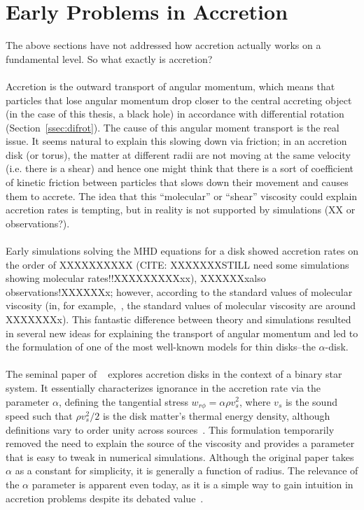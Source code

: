 
\section{Early Problems in Accretion}\label{sec:early}
The above sections have not addressed how accretion actually works on a fundamental level. So what exactly is accretion? \\
\\
Accretion is the outward transport of angular momentum, which means that particles that lose angular momentum drop closer to the central accreting object (in the case of this thesis, a black hole) in accordance with differential rotation (Section~\ref{ssec:difrot}). The cause of this angular moment transport is the real issue. It seems natural to explain this slowing down via friction; in an accretion disk (or torus), the matter at different radii are not moving at the same velocity (i.e. there is a shear) and hence one might think that there is a sort of coefficient of kinetic friction between particles that slows down their movement and causes them to accrete. The idea that this ``molecular'' or ``shear'' viscosity could explain accretion rates is tempting, but in reality is not supported by simulations (XX or observations?).\\
\\
Early simulations solving the MHD equations for a disk showed accretion rates on the order of XXXXXXXXXX (CITE: XXXXXXXSTILL need some simulations showing molecular rates!!XXXXXXXXXxx), XXXXXXxalso observations!XXXXXXx; however, according to the standard values of molecular viscosity (in, for example,~\citet{Spitzer1962}, the standard values of molecular viscosity are around XXXXXXXx). This fantastic difference between theory and simulations resulted in several new ideas for explaining the transport of angular momentum and led to the formulation of one of the most well-known models for thin disks--the $\alpha$-disk.\\
\\
The seminal paper of ~\citet{SS1973} explores accretion disks in the context of a binary star system. It essentially characterizes ignorance in the accretion rate via the parameter $\alpha$, defining the tangential stress $w_{r\phi}=\alpha\rho v_s^2$, where $v_s$ is the sound speed such that $\rho v_s^2/2$ is the disk matter's thermal energy density, although definitions vary to order unity across sources~\cite{SS1973}. This formulation temporarily removed the need to explain the source of the viscosity and provides a parameter that is easy to tweak in numerical simulations. Although the original paper takes $\alpha$ as a constant for simplicity, it is generally a function of radius. The relevance of the $\alpha$ parameter is apparent even today, as it is a simple way to gain intuition in accretion problems despite its debated value~\cite{PennaEA2013}. \\
